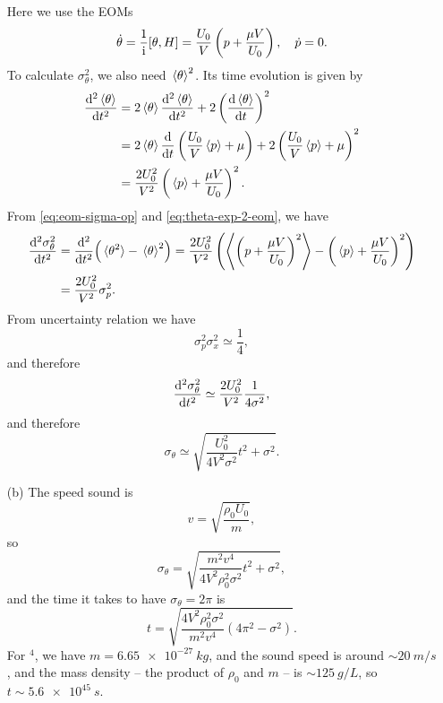 \documentclass[hyperref, a4paper]{article}
\newcommand*{\ii}{\mathrm{i}}
\begin{document}
\begin{itemize}
Here we use the EOMs 
\begin{equation}
    \dot{\theta} = \frac{1}{\ii} \comm{\theta}{H} = \frac{U_0}{V} \left( p + \frac{\mu V}{U_0} \right),
    \quad \dot{p} = 0.
\end{equation}
To calculate $\sigma_\theta^2$, we also need $\expval*{\theta}^2$. Its time evolution is given by 
\begin{equation}
    \begin{aligned}
        \dv[2]{\expval*{\theta}}{t} &= 2 \expval*{\theta} \dv[2]{\expval*{\theta}}{t} 
       + 2 \left( \dv{\expval*{\theta}}{t} \right)^2  \\
       &= 2 \expval*{\theta} \dv{t} \left(  \frac{U_0}{V} \expval*{p} + \mu \right)
       + 2 \left(  \frac{U_0}{V} \expval*{p} + \mu \right)^2 \\
       &= \frac{2 U_0^2}{V^2} \left( \expval*{p} + \frac{\mu V}{U_0} \right)^2 .
    \end{aligned}
    \label{eq:theta-exp-2-eom}
\end{equation}
From \eqref{eq:eom-sigma-op} and \eqref{eq:theta-exp-2-eom}, we have 
\begin{equation}
    \begin{aligned}
        \dv[2]{\sigma_\theta^2}{t} &= 
        \dv[2]{t} (\expval*{\theta^2} - \expval*{\theta}^2) 
        = \frac{2 U_0^2}{V^2} \left( 
            \expval{\left( p + \frac{\mu V}{U_0} \right)^2} 
            - \left( \expval*{p} + \frac{\mu V}{U_0} \right)^2 
        \right)  \\
        &= \frac{2 U_0^2}{V^2} \sigma_p^2.
    \end{aligned}
\end{equation}
From uncertainty relation we have 
\begin{equation}
    \sigma_p^2 \sigma_x^2 \simeq \frac{1}{4},
\end{equation}
and therefore 
\begin{equation}
    \dv[2]{\sigma_\theta^2}{t} \simeq \frac{2 U_0^2}{V^2} \frac{1}{4 \sigma^2},
\end{equation}
and therefore 
\begin{equation}
    \sigma_\theta \simeq \sqrt{ \frac{ U_0^2}{4 V^2 \sigma^2} t^2 + \sigma^2 }.
\end{equation}

\item[(b)] The speed sound is 
\begin{equation}
    v = \sqrt{\frac{\rho_0 U_0}{m}},
\end{equation}
so 
\begin{equation}
    \sigma_\theta  = \sqrt{ \frac{m^2 v^4}{4 V^2 \rho_0^2 \sigma^2} t^2 + \sigma^2 },
\end{equation}
and the time it takes to have $\sigma_\theta = 2 \pi$ is 
\begin{equation}
    t = \sqrt{ \frac{4 V^2 \rho_0^2 \sigma^2}{m^2 v^4} (4\pi^2 - \sigma^2 )}.
\end{equation} 
For $^4$, we have $m = \SI{6.65e-27}{kg}$,
and the sound speed is around $\sim \SI{20}{m/s}$ \cite{PhysRev.71.600},
and the mass density -- the product of $\rho_0$ and $m$ -- is $\sim \SI{125}{g/L}$,
so $t \sim \SI{5.6e45}{s}$.


\end{itemize}
\end{document}
